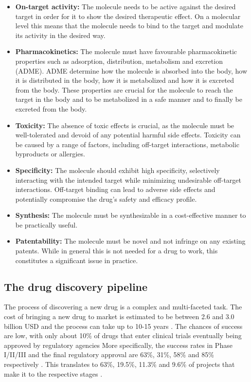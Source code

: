 \begin{itemize}
    \item \textbf{On-target activity:} The molecule needs to be active against
    the desired target in order for it to show the desired therapeutic effect.
    On a molecular level this means that the molecule needs to bind to the target
    and modulate its activity in the desired way. 
    \item \textbf{Pharmacokinetics:} The molecule must have favourable
    pharmacokinetic properties such as adsorption, distribution, metabolism and
    excretion (ADME). ADME determine how the molecule is absorbed into the
    body, how it is distributed in the body, how it is metabolized and how it is
    excreted from the body. These properties are crucial for the molecule to
    reach the target in the body and to be metabolized in a safe manner and to 
    finally be excreted from the body.
    \item \textbf{Toxicity:}  The absence of toxic effects is crucial, as the
    molecule must be well-tolerated and devoid of any potential harmful side
    effects. Toxicity can be caused by a range of factors, including off-target
    interactions, metabolic byproducts or allergies.
    \item \textbf{Specificity:}  The molecule should exhibit high specificity,
    selectively interacting with the intended target while minimizing
    undesirable off-target interactions. Off-target binding can lead to adverse
    side effects and potentially compromise the drug's safety and efficacy
    profile.
    \item \textbf{Synthesis:} The molecule must be synthesizable in a
    cost-effective manner to be practically useful.
    \item \textbf{Patentability:} The molecule must be novel and not infringe on
    any existing patents. While in general this is not needed for a drug to work, 
    this constitutes a significant issue in practice.
\end{itemize}

\subsection{The drug discovery pipeline}
The process of discovering a new drug is a complex and multi-faceted task. The
cost of bringing a new drug to market is estimated to be between 2.6 and 3.0
billion USD \citep{todo} and the process can take up to 10-15 years
\citep{todo}. The chances of success are low, with only about 10\% of drugs that
enter clinical trials eventually being approved by regulatory agencies
More specifically, the success rates
in Phase I/II/III and the final regulatory approval are 63\%, 31\%, 58\% and
85\% respectively \citep{mullardParsingClinicalSuccess2016}. This translates to
63\%, 19.5\%, 11.3\% and 9.6\% of projects that make it to the respective stages
\citep{mullardParsingClinicalSuccess2016}.

